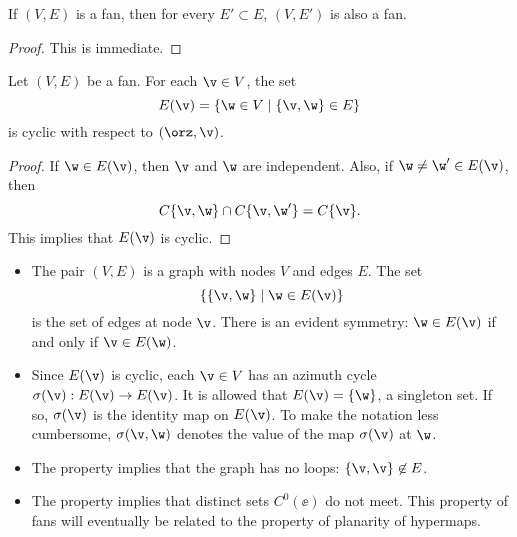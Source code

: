 \begin{lemma}\label{lemma:subset-fan}
If $(V,E)$ is a fan, then for every $E'\subset E$,  $(V,E')$ is also a fan.
\end{lemma}

\begin{proof} This is immediate.
\end{proof}

\begin{lemma}  Let $(V,E)$ be a fan.
For each $\v\in V$, the set
        $$
        E(\v) = \{\w\in V\mid \{\v,\w\}\in E\}
        $$
        is cyclic with respect to $(\orz,\v)$.
\end{lemma}
%

\begin{proof}  If $\w\in E(\v)$, then $\v$ and $\w$ are independent.
Also, if $\w\ne \w'\in E(\v)$, then
$$
C\{\v,\w\}\cap C\{\v,\w'\} = C\{\v\}.
$$
This implies that $E(\v)$ is cyclic.
\end{proof}

\begin{remark}
\begin{itemize}
\item The pair $(V,E)$ is a graph with nodes $V$ and edges $E$.  The set
$$\{\{\v,\w\}\mid \w\in E(\v)\}$$ is the set of edges at node $\v$.
There is an evident symmetry:  $\w\in E(\v)$ if and only if $\v\in E(\w)$.   
%
\item
Since $E(\v)$ is cyclic,
each $\v\in V$ has an azimuth cycle $\sigma(\v):E(\v)\to E(\v)$.
It is allowed that $E(\v) = \{\w\}$,  a
%
singleton set. If so,
$\sigma(\v)$ is the identity map on $E(\v)$.
%
To make the notation less cumbersome, $\sigma(\v,\w)$ denotes the value of the map $\sigma(\v)$ at $\w$.
%
\item 
The property  implies that the graph has no loops: $\{\v,\v\}\not\in E$.
%
\item The property  implies that distinct sets $C^0(\ee)$
do not meet.   This property of fans will eventually be related to  the property of planarity of hypermaps.
%
%
%
\end{itemize}
\end{remark}

